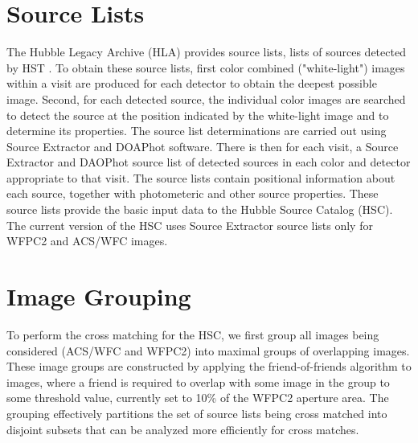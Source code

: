 \section{Source Lists}

The Hubble Legacy Archive (HLA) provides source lists, lists of sources detected by HST \cite{2008ASPC..394..481W}. To obtain these source lists, first color combined ("white-light") images within a visit are produced for each detector to obtain the deepest possible image. Second, for each detected source, the individual color images are searched to detect the source at the position indicated by the white-light image and to determine its properties. The source list determinations are carried out using Source Extractor and DOAPhot software. There is then for each visit, a Source Extractor and DAOPhot source list of detected sources in each color and detector appropriate to that visit.  The source lists contain positional information about each source, together with photometeric and other source properties. These source lists provide the basic input data to the Hubble Source Catalog (HSC). The current version of the HSC uses Source Extractor source lists only for WFPC2 and ACS/WFC images.

\section{Image Grouping}
To perform the cross matching for the HSC, we first group all images being considered (ACS/WFC and WFPC2) into maximal groups of overlapping images.  These image groups are constructed by applying the friend-of-friends algorithm to images, where a friend is required to overlap with some image in the group to some threshold value, currently set to 10\% of the WFPC2 aperture area. The grouping effectively partitions the set of source lists being cross matched into disjoint subsets that can be analyzed more efficiently for cross matches.

